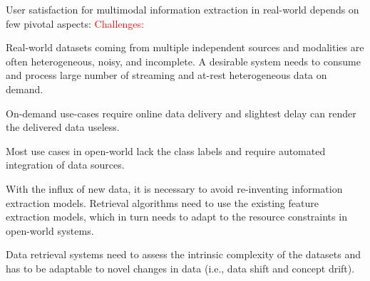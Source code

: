 
User satisfaction for multimodal information extraction in real-world depends on few pivotal aspects:
\textcolor{red}{Challenges:}
\begin{enumerate*}[label=(\roman*)]
    \item Real-world datasets coming from multiple independent sources and modalities are often heterogeneous, noisy, and incomplete. %
    A desirable system needs to consume and process large number of streaming and at-rest heterogeneous data on demand.
    \item 
    On-demand use-cases require online data delivery and slightest delay can render the delivered data useless.
    \item Most use cases in open-world lack the class labels and require automated integration of data sources. %
    \item With the influx of new data, it is necessary to avoid re-inventing information extraction models. Retrieval algorithms need to use the existing feature extraction models, which in turn needs to adapt to the resource constraints in open-world systems.
    \item Data retrieval systems need to assess  the intrinsic complexity of the datasets and has to be adaptable to novel changes in data (i.e., data shift and concept drift).
\end{enumerate*}

